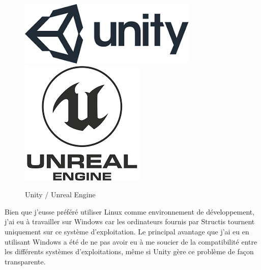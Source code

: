 \documentclass[a4paper]{article}
\begin{document}
    \begin{figure}[H]
        \centering
        \includegraphics[scale=0.35]{img/logo-unity}
        \hspace{10pt}
        \includegraphics[scale=0.35]{img/logo-unreal}
        \caption{Unity / Unreal Engine}
    \end{figure}

    \vfill

    Bien que j'eusse préféré utiliser Linux comme environnement de développement, j'ai eu à travailler sur Windows car les ordinateurs fournis par Structis tournent uniquement sur ce système d'exploitation. Le principal avantage que j'ai eu en utilisant Windows a été de ne pas avoir eu à me soucier de la compatibilité entre les différents systèmes d'exploitations, même si Unity gère ce problème de façon transparente. \\
\end{document}

